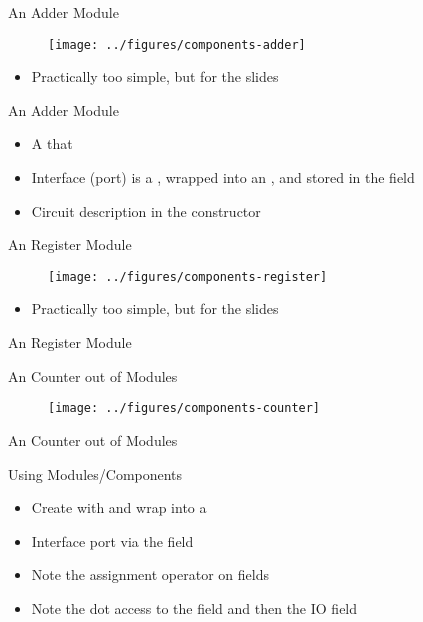 \begin{frame}[fragile]{An Adder Module}
\begin{figure}
  \texttt{[image: ../figures/components-adder]}
\end{figure}
\begin{itemize}
\item Practically too simple, but for the slides
\end{itemize}
\end{frame}

\begin{frame}[fragile]{An Adder Module}
\begin{itemize}
\item A  that  
\item Interface (port) is a , wrapped into an , and stored in the field 
\item Circuit description in the constructor
\end{itemize}
\end{frame}


\begin{frame}[fragile]{An Register Module}
\begin{figure}
  \texttt{[image: ../figures/components-register]}
\end{figure}
\begin{itemize}
\item Practically too simple, but for the slides
\end{itemize}
\end{frame}

\begin{frame}[fragile]{An Register Module}
\end{frame}


\begin{frame}[fragile]{An Counter out of  Modules}
\begin{figure}
  \texttt{[image: ../figures/components-counter]}
\end{figure}
\end{frame}

\begin{frame}[fragile]{An Counter out of  Modules}
\end{frame}

\begin{frame}[fragile]{Using Modules/Components}
\begin{itemize}
\item Create with  and wrap into a 
\item Interface port via the  field
\item Note the assignment operator \code{:=} on  fields
\item Note the dot access to the field  and then the IO field
\end{itemize}
\end{frame}

